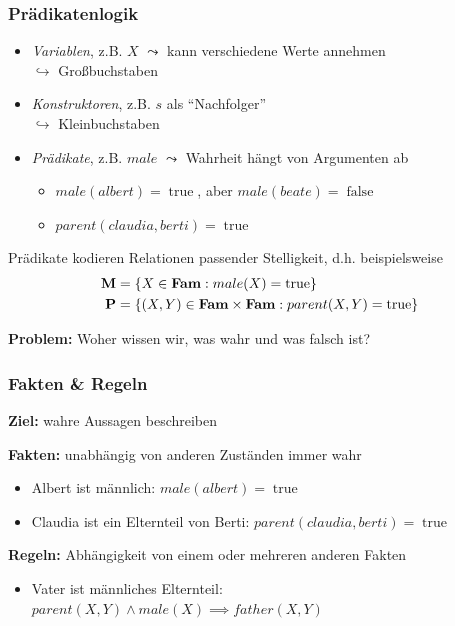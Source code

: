 \documentclass{beamer}
\newcommand{\true}{\operatorname{true}}
\newcommand{\false}{\operatorname{false}}
\newcommand{\operator}[1]{\textbf{\textcolor{black}{#1}}}
\newcommand{\Fam}{\operator{Fam}}
\begin{document}
\begin{frame} \frametitle{Prädikatenlogik}
	\footnotesize
	\begin{itemize}
		\item \textit{Variablen}, z.B. $X$ $\leadsto$ kann verschiedene Werte annehmen \\
		$\hookrightarrow$ Großbuchstaben
		\item \textit{Konstruktoren}, z.B. $s$ als \enquote{Nachfolger} \\
		$\hookrightarrow$ Kleinbuchstaben
		\item \textit{Prädikate}, z.B. $male$ $\leadsto$ Wahrheit hängt von Argumenten ab 
		\begin{itemize} \footnotesize
			\item $male(albert) = \true$, aber $male(beate) = \false$
			\item $parent(claudia, berti) = \true$
		\end{itemize}
	\end{itemize}
	
	Prädikate kodieren Relationen passender Stelligkeit, d.h. beispielsweise
	\begin{align*}
		\operator{M} &= \menge{X \in \Fam : male(X) = \true} \\
		\operator{P} &= \menge{(X,Y) \in \Fam \times \Fam : parent(X,Y) = \true}
	\end{align*}

	\textbf{Problem:} Woher wissen wir, was wahr und was falsch ist?
\end{frame}

\begin{frame} \frametitle{Fakten \& Regeln}
	\footnotesize
	
	\textbf{Ziel:} wahre Aussagen beschreiben
	\bigskip
	
	\textbf{Fakten:} unabhängig von anderen Zuständen immer wahr
	\begin{itemize}
		\item Albert ist männlich: $male(albert) = \true$
		\item Claudia ist ein Elternteil von Berti: $parent(claudia, berti) = \true$
	\end{itemize}
	
	\textbf{Regeln:} Abhängigkeit von einem oder mehreren anderen Fakten
	\begin{itemize}
		\item Vater ist männliches Elternteil:
		$parent(X,Y) \land male(X) \implies father(X,Y)$ 
	\end{itemize}
\end{frame}
\end{document}

